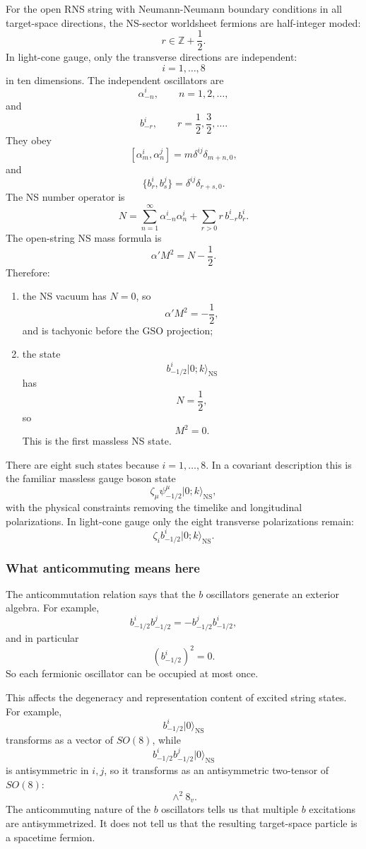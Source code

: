 \documentclass[
  10pt,
  a4paper,
  openany]{book}
\begin{document}
For the open RNS string with Neumann-Neumann boundary conditions in all
target-space directions, the NS-sector worldsheet fermions are
half-integer moded: \[
r\in\mathbb Z+\frac{1}{2}.
\] In light-cone gauge, only the transverse directions are independent:
\[
i=1,\dots,8
\] in ten dimensions. The independent oscillators are \[
\alpha_{-n}^i,
\qquad
n=1,2,\dots,
\] and \[
b_{-r}^i,
\qquad
r=\frac{1}{2},\frac{3}{2},\dots.
\] They obey \[
[\alpha_m^i,\alpha_n^j]
=
m\delta^{ij}\delta_{m+n,0},
\] and \[
\{b_r^i,b_s^j\}
=
\delta^{ij}\delta_{r+s,0}.
\] The NS number operator is \[
N
=
\sum_{n=1}^{\infty}\alpha_{-n}^i\alpha_n^i
+
\sum_{r>0}r\, b_{-r}^i b_r^i.
\] The open-string NS mass formula is \[
\alpha' M^2
=
N-\frac{1}{2}.
\] Therefore:

\begin{enumerate}
\def\labelenumi{\arabic{enumi}.}
\item
  the NS vacuum has \(N=0\), so \[
  \alpha' M^2=-\frac{1}{2},
  \] and is tachyonic before the GSO projection;
\item
  the state \[
  b_{-1/2}^i|0;k\rangle_{\text{NS}}
  \] has \[
  N=\frac{1}{2},
  \] so \[
  M^2=0.
  \] This is the first massless NS state.
\end{enumerate}

There are eight such states because \(i=1,\dots,8\). In a covariant
description this is the familiar massless gauge boson state \[
\zeta_\mu \psi_{-1/2}^\mu|0;k\rangle_{\text{NS}},
\] with the physical constraints removing the timelike and longitudinal
polarizations. In light-cone gauge only the eight transverse
polarizations remain: \[
\zeta_i b_{-1/2}^i|0;k\rangle_{\text{NS}}.
\]

\subsubsection{What anticommuting means
here}\label{what-anticommuting-means-here}

The anticommutation relation says that the \(b\) oscillators generate an
exterior algebra. For example, \[
b_{-1/2}^i b_{-1/2}^j
=
-
b_{-1/2}^j b_{-1/2}^i,
\] and in particular \[
(b_{-1/2}^i)^2=0.
\] So each fermionic oscillator can be occupied at most once.

This affects the degeneracy and representation content of excited string
states. For example, \[
b_{-1/2}^i|0\rangle_{\text{NS}}
\] transforms as a vector of \(SO(8)\), while \[
b_{-1/2}^i b_{-1/2}^j|0\rangle_{\text{NS}}
\] is antisymmetric in \(i,j\), so it transforms as an antisymmetric
two-tensor of \(SO(8)\): \[
\wedge^2 8_v.
\] The anticommuting nature of the \(b\) oscillators tells us that
multiple \(b\) excitations are antisymmetrized. It does not tell us that
the resulting target-space particle is a spacetime fermion.
\end{document}
